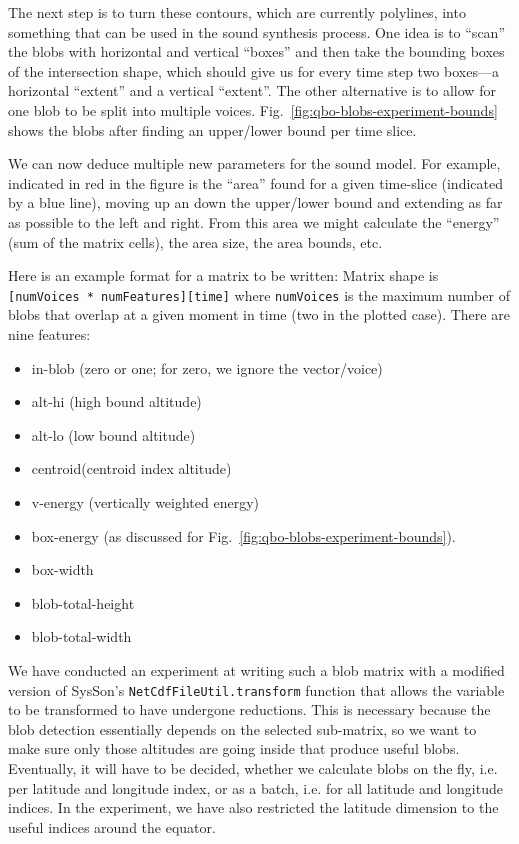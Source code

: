 \documentclass[11pt,a4paper]{article}
\newcommand{\figref}[1]{Fig.~\ref{#1}}
\begin{document}
The next step is to turn these contours, which are currently polylines, into something that can be used in the sound synthesis process. One idea is to ``scan'' the blobs with horizontal and vertical ``boxes'' and then take the bounding boxes of the intersection shape, which should give us for every time step two boxes---a horizontal ``extent'' and a vertical ``extent''. The other alternative is to allow for one blob to be split into multiple voices. \figref{fig:qbo-blobs-experiment-bounds} shows the blobs after finding an upper/lower bound per time slice.

We can now deduce multiple new parameters for the sound model. For example, indicated in red in the figure is the ``area'' found for a given time-slice (indicated by a blue line), moving up an down the upper/lower bound and extending as far as possible to the left and right. From this area we might calculate the ``energy'' (sum of the matrix cells), the area size, the area bounds, etc.

Here is an example format for a matrix to be written: Matrix shape is \Verb![numVoices * numFeatures][time]! where \Verb!numVoices! is the maximum number of blobs that overlap at a given moment in time (two in the plotted case). There are nine features:
%
\begin{itemize}
\item in-blob (zero or one; for zero, we ignore the vector/voice)
\item alt-hi (high bound altitude)
\item alt-lo (low bound altitude)
\item centroid(centroid index altitude)
\item v-energy (vertically weighted energy)
\item box-energy (as discussed for \figref{fig:qbo-blobs-experiment-bounds}).
\item box-width
\item blob-total-height
\item blob-total-width
\end{itemize}

We have conducted an experiment at writing such a blob matrix with a modified version of SysSon's \Verb!NetCdfFileUtil.transform! function that allows the variable to be transformed to have undergone reductions. This is necessary because the blob detection essentially depends on the selected sub-matrix, so we want to make sure only those altitudes are going inside that produce useful blobs. Eventually, it will have to be decided, whether we calculate blobs on the fly, i.e. per latitude and longitude index, or as a batch, i.e. for all latitude and longitude indices. In the experiment, we have also restricted the latitude dimension to the useful indices around the equator.
\end{document}
